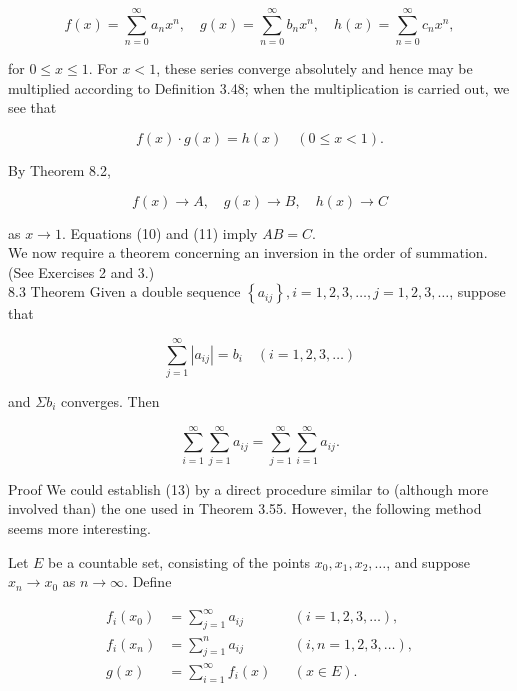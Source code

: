 \documentclass[10pt]{article}
\begin{document}
$$
f(x)=\sum_{n=0}^{\infty} a_{n} x^{n}, \quad g(x)=\sum_{n=0}^{\infty} b_{n} x^{n}, \quad h(x)=\sum_{n=0}^{\infty} c_{n} x^{n},
$$

for $0 \leq x \leq 1$. For $x<1$, these series converge absolutely and hence may be multiplied according to Definition 3.48; when the multiplication is carried out, we see that


\begin{equation*}
f(x) \cdot g(x)=h(x) \quad(0 \leq x<1) . \tag{10}
\end{equation*}


By Theorem 8.2,


\begin{equation*}
f(x) \rightarrow A, \quad g(x) \rightarrow B, \quad h(x) \rightarrow C \tag{11}
\end{equation*}


as $x \rightarrow 1$. Equations (10) and (11) imply $A B=C$.\\
We now require a theorem concerning an inversion in the order of summation. (See Exercises 2 and 3.)\\
8.3 Theorem Given a double sequence $\left\{a_{i j}\right\}, i=1,2,3, \ldots, j=1,2,3, \ldots$, suppose that


\begin{equation*}
\sum_{j=1}^{\infty}\left|a_{i j}\right|=b_{i} \quad(i=1,2,3, \ldots) \tag{12}
\end{equation*}


and $\Sigma b_{i}$ converges. Then


\begin{equation*}
\sum_{i=1}^{\infty} \sum_{j=1}^{\infty} a_{i j}=\sum_{j=1}^{\infty} \sum_{i=1}^{\infty} a_{i j} . \tag{13}
\end{equation*}


Proof We could establish (13) by a direct procedure similar to (although more involved than) the one used in Theorem 3.55. However, the following method seems more interesting.

Let $E$ be a countable set, consisting of the points $x_{0}, x_{1}, x_{2}, \ldots$, and suppose $x_{n} \rightarrow x_{0}$ as $n \rightarrow \infty$. Define


\begin{align*}
f_{i}\left(x_{0}\right) & =\sum_{j=1}^{\infty} a_{i j} & & (i=1,2,3, \ldots),  \tag{14}\\
f_{i}\left(x_{n}\right) & =\sum_{j=1}^{n} a_{i j} & & (i, n=1,2,3, \ldots),  \tag{15}\\
g(x) & =\sum_{i=1}^{\infty} f_{i}(x) & & (x \in E) . \tag{16}
\end{align*}
\end{document}
